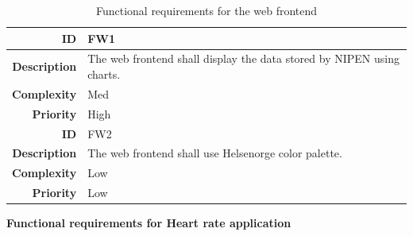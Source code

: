 \begin{table}[h]
\begin{center}
\begin{tabular}{ | r | p{11.5cm} | }
  \hline

  \textbf{ID} & FW1 \\
  \hline\noalign{\smallskip}\hline
  \textbf{Description}  & The web frontend shall display the data stored by NIPEN using charts.\\
  \textbf{Complexity}   & Med \\
  \textbf{Priority}     & High \\
  \hline\noalign{\smallskip}\noalign{\smallskip}\hline

  \textbf{ID} & FW2 \\
  \hline\noalign{\smallskip}\hline
  \textbf{Description}  & The web frontend shall use Helsenorge color palette. \\
  \textbf{Complexity}   & Low \\
  \textbf{Priority}     & Low \\
  
  \hline
\end{tabular}
\end{center}
\caption{Functional requirements for the web frontend}
\label{table:reqfrontend}
\end{table}

\newpage

\textbf{Functional requirements for Heart rate application}

